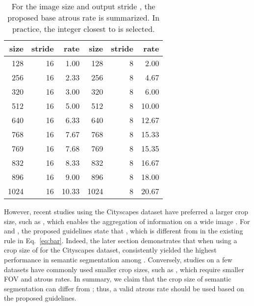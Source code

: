 \documentclass{article}
\def\eqref#1{Eq.~\ref{#1}}
\begin{document}
\begin{table}[t!]
	\caption{For the image size  and output stride , the proposed base atrous rate  is summarized. In practice, the integer closest to  is selected.}
	\label{tab:guide}
	\centering
	\begin{tabular}{rrr|rrr}
		\toprule
		size  & stride  & rate  & size  & stride  & rate  \\
		\midrule
		128      & 16         & 1.00       & 128      & 8          & 2.00       \\
		256      & 16         & 2.33       & 256      & 8          & 4.67       \\
		320      & 16         & 3.00       & 320      & 8          & 6.00       \\
		512      & 16         & 5.00       & 512      & 8          & 10.00      \\
		640      & 16         & 6.33       & 640      & 8          & 12.67      \\
		768      & 16         & 7.67       & 768      & 8          & 15.33      \\
		769      & 16         & 7.68       & 769      & 8          & 15.35      \\
		832      & 16         & 8.33       & 832      & 8          & 16.67      \\
		896      & 16         & 9.00       & 896      & 8          & 18.00      \\
		1024     & 16         & 10.33      & 1024     & 8          & 20.67      \\
		\bottomrule
	\end{tabular}
\end{table}

However, recent studies using the Cityscapes dataset have preferred a larger crop size, such as , which enables the aggregation of information on a wide image \citep{DBLP:conf/eccv/YinYCLZLH20,DBLP:journals/pami/HuangWWHSLH23,DBLP:journals/corr/abs-1907-12273,DBLP:conf/iccv/ZhuXBHB19}. For  and , the proposed guidelines state that , which is different from  in the existing rule in \eqref{eq:bar}. Indeed, the later section demonstrates that when using a crop size of  for the Cityscapes dataset,  consistently yielded the highest performance in semantic segmentation among . Conversely, studies on a few datasets have commonly used smaller crop sizes, such as , which require smaller FOV and atrous rates. In summary, we claim that the crop size of semantic segmentation can differ from ; thus, a valid atrous rate should be used based on the proposed guidelines.
\end{document}
